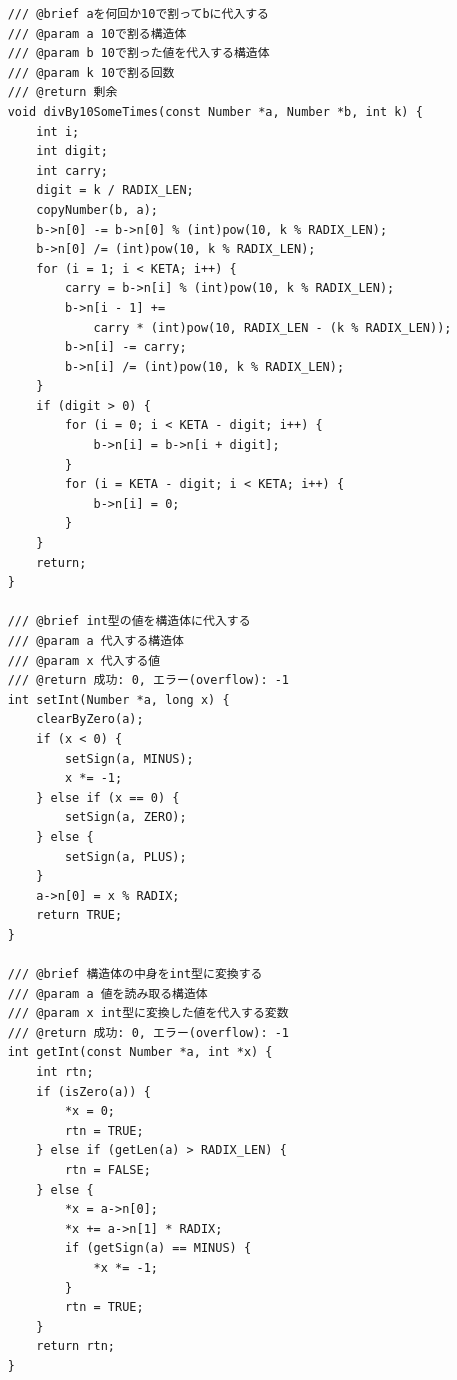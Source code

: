 \documentclass[a4paper,11pt,dvipdfmx]{jsarticle}
\begin{document}
\begin{lstlisting}
    /// @brief aを何回か10で割ってbに代入する
    /// @param a 10で割る構造体
    /// @param b 10で割った値を代入する構造体
    /// @param k 10で割る回数
    /// @return 剰余
    void divBy10SomeTimes(const Number *a, Number *b, int k) {
        int i;
        int digit;
        int carry;
        digit = k / RADIX_LEN;
        copyNumber(b, a);
        b->n[0] -= b->n[0] % (int)pow(10, k % RADIX_LEN);
        b->n[0] /= (int)pow(10, k % RADIX_LEN);
        for (i = 1; i < KETA; i++) {
            carry = b->n[i] % (int)pow(10, k % RADIX_LEN);
            b->n[i - 1] +=
                carry * (int)pow(10, RADIX_LEN - (k % RADIX_LEN));
            b->n[i] -= carry;
            b->n[i] /= (int)pow(10, k % RADIX_LEN);
        }
        if (digit > 0) {
            for (i = 0; i < KETA - digit; i++) {
                b->n[i] = b->n[i + digit];
            }
            for (i = KETA - digit; i < KETA; i++) {
                b->n[i] = 0;
            }
        }
        return;
    }
    
    /// @brief int型の値を構造体に代入する
    /// @param a 代入する構造体
    /// @param x 代入する値
    /// @return 成功: 0, エラー(overflow): -1
    int setInt(Number *a, long x) {
        clearByZero(a);
        if (x < 0) {
            setSign(a, MINUS);
            x *= -1;
        } else if (x == 0) {
            setSign(a, ZERO);
        } else {
            setSign(a, PLUS);
        }
        a->n[0] = x % RADIX;
        return TRUE;
    }
    
    /// @brief 構造体の中身をint型に変換する
    /// @param a 値を読み取る構造体
    /// @param x int型に変換した値を代入する変数
    /// @return 成功: 0, エラー(overflow): -1
    int getInt(const Number *a, int *x) {
        int rtn;
        if (isZero(a)) {
            *x = 0;
            rtn = TRUE;
        } else if (getLen(a) > RADIX_LEN) {
            rtn = FALSE;
        } else {
            *x = a->n[0];
            *x += a->n[1] * RADIX;
            if (getSign(a) == MINUS) {
                *x *= -1;
            }
            rtn = TRUE;
        }
        return rtn;
    }
    

\end{lstlisting}
\end{document}
